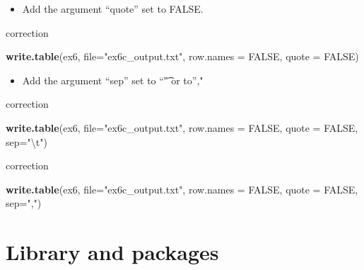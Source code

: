 \documentclass[]{book}
\newenvironment{Shaded}{\begin{snugshade}}{\end{snugshade}}
\newcommand{\CharTok}[1]{\textcolor[rgb]{0.31,0.60,0.02}{#1}}
\newcommand{\DataTypeTok}[1]{\textcolor[rgb]{0.13,0.29,0.53}{#1}}
\newcommand{\KeywordTok}[1]{\textcolor[rgb]{0.13,0.29,0.53}{\textbf{#1}}}
\newcommand{\NormalTok}[1]{#1}
\newcommand{\OtherTok}[1]{\textcolor[rgb]{0.56,0.35,0.01}{#1}}
\newcommand{\StringTok}[1]{\textcolor[rgb]{0.31,0.60,0.02}{#1}}
\providecommand{\tightlist}{%
  \setlength{\itemsep}{0pt}\setlength{\parskip}{0pt}}
\begin{document}
\begin{itemize}
\tightlist
\item
  Add the argument ``quote'' set to FALSE.
\end{itemize}

correction

\begin{Shaded}
\begin{Highlighting}[]
\KeywordTok{write.table}\NormalTok{(ex6, }\DataTypeTok{file=}\StringTok{"ex6c_output.txt"}\NormalTok{, }
            \DataTypeTok{row.names =} \OtherTok{FALSE}\NormalTok{,}
            \DataTypeTok{quote =} \OtherTok{FALSE}\NormalTok{)}
\end{Highlighting}
\end{Shaded}

\begin{itemize}
\tightlist
\item
  Add the argument ``sep'' set to ``\t" or to'',"
\end{itemize}

correction

\begin{Shaded}
\begin{Highlighting}[]
\KeywordTok{write.table}\NormalTok{(ex6, }\DataTypeTok{file=}\StringTok{"ex6c_output.txt"}\NormalTok{, }
            \DataTypeTok{row.names =} \OtherTok{FALSE}\NormalTok{,}
            \DataTypeTok{quote =} \OtherTok{FALSE}\NormalTok{,}
            \DataTypeTok{sep=}\StringTok{"}\CharTok{\textbackslash{}t}\StringTok{"}\NormalTok{)}
\end{Highlighting}
\end{Shaded}

correction

\begin{Shaded}
\begin{Highlighting}[]
\KeywordTok{write.table}\NormalTok{(ex6, }\DataTypeTok{file=}\StringTok{"ex6c_output.txt"}\NormalTok{, }
            \DataTypeTok{row.names =} \OtherTok{FALSE}\NormalTok{,}
            \DataTypeTok{quote =} \OtherTok{FALSE}\NormalTok{,}
            \DataTypeTok{sep=}\StringTok{","}\NormalTok{)}
\end{Highlighting}
\end{Shaded}

\hypertarget{library-and-packages}{%
\chapter{Library and packages}\label{library-and-packages}}
\end{document}
